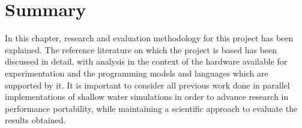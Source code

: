 \section{Summary}

In this chapter, research and evaluation methodology for this project has been explained. The reference literature on which the project is based has been discussed in detail, with analysis in the context of the hardware available for experimentation and the programming models and languages which are supported by it. It is important to consider all previous work done in parallel implementations of shallow water simulations in order to advance research in performance portability, while maintaining a scientific approach to evaluate the results obtained.
